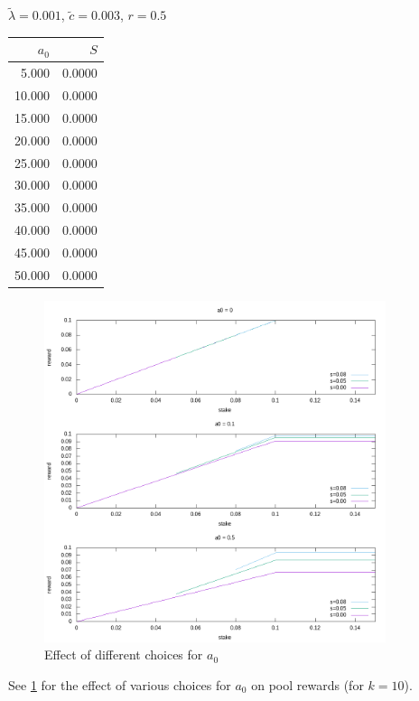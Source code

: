 \documentclass[11pt,a4paper,dvipsnames,twosided]{article}
\begin{document}
\begin{minipage}[t]{\textwidth}
\begin{minipage}[t]{0.32\textwidth}
        \footnotesize
        \begin{flushleft}$\tilde{\lambda}=0.001$, $\tilde{c}=0.003$, $r=0.5$\end{flushleft}
        \begin{tabular}[t]{rr}
            $a_0$ & $S$ \\
            \hline
             5.000 & 0.0000 \\
            10.000 & 0.0000 \\
            15.000 & 0.0000 \\
            20.000 & 0.0000 \\
            25.000 & 0.0000 \\
            30.000 & 0.0000 \\
            35.000 & 0.0000 \\
            40.000 & 0.0000 \\
            45.000 & 0.0000 \\
            50.000 & 0.0000 \\
        \end{tabular}
    \end{minipage}
\end{minipage}

\begin{figure}
\centering
\includegraphics[width=10cm]{rewards.png}
\caption{Effect of different choices for \(a_0\)}
\label{fig:rewards}
\end{figure}

See \cref{fig:rewards} for the effect of various choices for
\(a_0\) on pool rewards (for \(k=10\)).
\end{document}
